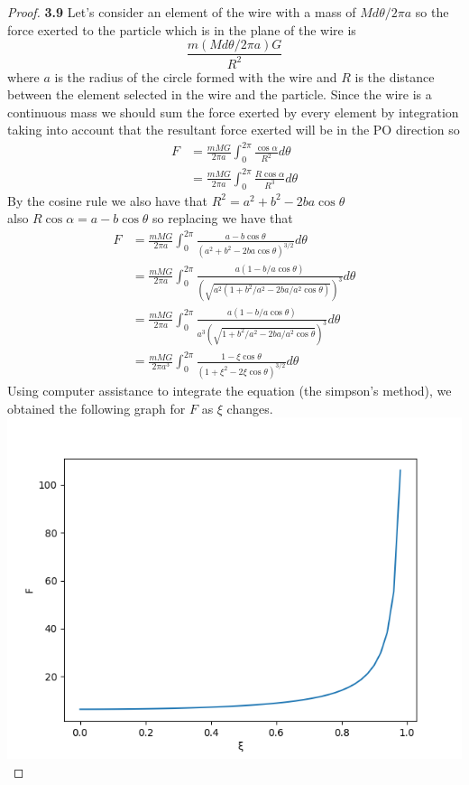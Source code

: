 \documentclass[11pt]{article}
\begin{document}
	\begin{proof}{\textbf{3.9}}
        Let's consider an element of the wire with a mass of $M d\theta/2\pi a$
        so the force exerted to the particle which is in the plane of the wire
        is
        $$\frac{m(M d\theta/2\pi a)G}{R^2}$$
        where $a$ is the radius of the circle formed with the wire and $R$ is
        the distance between the element selected in the wire and the particle.
        Since the wire is a continuous mass we should sum the force exerted by
        every element by integration taking into account that the resultant
        force exerted will be in the PO direction so
        \begin{align*}
            F &= \frac{mMG}{2\pi a} \int_0^{2\pi}{\frac{\cos{\alpha}}{R^2}}d\theta \\
              &= \frac{mMG}{2\pi a} \int_0^{2\pi}{\frac{R\cos{\alpha}}{R^3}}d\theta
        \end{align*}
        By the cosine rule we also have that $R^2 = a^2 + b^2 - 2ba\cos{\theta}$\\
        also $R\cos{\alpha} = a - b\cos{\theta}$ so replacing we have that
        \begin{align*}
            F &= \frac{mMG}{2\pi a} \int_0^{2\pi}{\frac{a - b\cos{\theta}}{(a^2 + b^2 - 2ba\cos{\theta})^{3/2}}}d\theta \\
              &= \frac{mMG}{2\pi a} \int_0^{2\pi}{\frac{a(1 - b/a\cos{\theta})}{(\sqrt{a^2(1 + b^2/a^2 - 2ba/a^2 \cos{\theta})})^{3}}}d\theta \\
              &= \frac{mMG}{2\pi a} \int_0^{2\pi}{\frac{a(1 - b/a\cos{\theta})}{a^3(\sqrt{1 + b^2/a^2 - 2ba/a^2 \cos{\theta}})^{3}}}d\theta \\
              &= \frac{mMG}{2\pi a^3} \int_0^{2\pi}{\frac{1 - \xi\cos{\theta}}{(1 + \xi^2 - 2\xi\cos{\theta})^{3/2}}}d\theta
        \end{align*}
\cleardoublepage
        Using computer assistance to integrate the equation (the simpson's
        method), we obtained the following graph for $F$ as $\xi$ changes. \\
        \includegraphics{gregory-3.9.png}

\end{proof}
\end{document}

